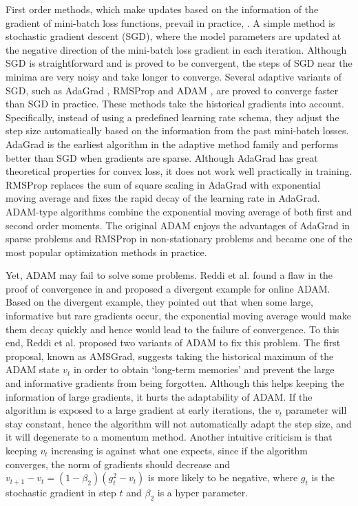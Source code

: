 \documentclass[twoside]{article}
\begin{document}
First order methods, which make updates based on the information of the gradient of mini-batch loss functions, prevail in practice, \cite{Goodfellow-et-al-2016}. A simple method is stochastic gradient descent (SGD), where the model parameters are updated at the negative direction of the mini-batch loss gradient in each iteration. Although SGD is straightforward and is proved to be convergent, the steps of SGD near the minima are very noisy and take longer to converge. Several adaptive variants of SGD, such as AdaGrad \cite{duchi2011adaptive}, RMSProp \cite{hinton2012neural} and ADAM \cite{kingma2014adam}, are proved to converge faster than SGD in practice. These methods take the historical gradients into account. Specifically, instead of using a predefined learning rate schema, they adjust the step size automatically based on the information from the past mini-batch losses. AdaGrad is the earliest algorithm in the adaptive method family and performs better than SGD when gradients are sparse. Although AdaGrad has great theoretical properties for convex loss, it does not work well practically in training. RMSProp replaces the sum of square scaling in AdaGrad with exponential moving average and fixes the rapid decay of the learning rate in AdaGrad. ADAM-type algorithms combine the exponential moving average of both first and second order moments. The original ADAM enjoys the advantages of AdaGrad in sparse problems and RMSProp in non-stationary problems and became one of the most popular optimization methods in practice.

Yet, ADAM may fail to solve some problems. Reddi et al. \cite{reddi2019convergence} found a flaw in the proof of convergence in \cite{kingma2014adam} and proposed a divergent example for online ADAM. Based on the divergent example, they pointed out that when some large, informative but rare gradients occur, the exponential moving average would make them decay quickly and hence would lead to the failure of convergence. To this end, Reddi et al. proposed two variants of ADAM to fix this problem. The first proposal, known as AMSGrad, suggests taking the historical maximum of the ADAM state $v_t$ in order to obtain `long-term memories' and prevent the large and informative gradients from being forgotten. Although this helps keeping the information of large gradients, it hurts the adaptability of ADAM. If the algorithm is exposed to a large gradient at early iterations, the $v_t$ parameter will stay constant, hence the algorithm will not automatically adapt the step size, and it will degenerate to a momentum method. Another intuitive criticism is that keeping $v_t$ increasing is against what one expects, since if the algorithm converges, the norm of gradients should decrease and $v_{t+1} - v_t = (1-\beta_2) (g_t^2-v_t)$ is more likely to be negative, where $g_t$ is the stochastic gradient in step $t$ and $\beta_2$ is a hyper parameter.
\end{document}
